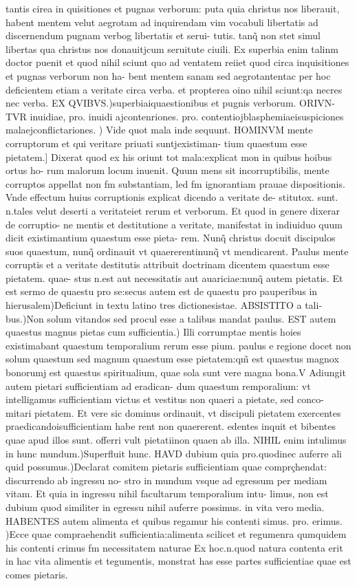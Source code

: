 \documentclass{article}
\begin{document}
\begin{pages}
\pstart tantis cirea in quisitiones et pugnas verborum: puta quia christus nos liberauit, habent mentem velut aegrotam ad inquirendam vim vocabuli libertatis ad discernendum pugnam verbog libertatis et serui- tutis. tanq̃ non stet simul libertas qua christus nos donauitjcum seruitute ciuili. Ex superbia enim talinm doctor puenit et quod nihil sciunt quo ad ventatem reiiet quod circa inquisitiones et pugnas verborum non ha- bent mentem sanam sed aegrotantentac per hoc deficientem etiam a veritate circa verba. et propterea oino nihil sciunt:qa necres nec verba. EX QVIBVS.)superbiaiquaestionibus et pugnis verborum. ORIVN- TVR inuidiae, pro. inuidi ajcontenriones. pro. contentiojblasphemiaeisuspiciones malaejconflictariones. ) Vide quot mala inde sequunt. HOMINVM mente corruptorum et qui veritare priuati suntjexistiman- tium quaestum esse pietatem.] Dixerat quod ex his oriunt tot mala:explicat mon in quibus hoibus ortus ho- rum malorum locum inuenit. Quum mens sit incorruptibilis, mente corruptos appellat non fm substantiam, led fm ignorantiam prauae dispositionis. Vnde effectum huius corruptionis explicat dicendo a veritate de- stitutox. sunt. n.tales velut deserti a veritateiet rerum et verborum. Et quod in genere dixerar de corruptio- ne mentis et destitutione a veritate, manifestat in indiuiduo quum dicit existimantium quaestum esse pieta- rem. Nunq̃ christus docuit discipulos suos quaestum, nunq̃ ordinauit vt quaererentinunq̃ vt mendicarent. Paulus mente corruptis et a veritate destitutis attribuit doctrinam dicentem quaestum esse pietatem. quae- stus n.est aut necessitatis aut auariciae:nunq̃ autem pietatis. Et est sermo de quaestu pro se:secus autem est de quaestu pro pauperibus in hierusalem)Deficiunt in textu latino tres dictionesistae. ABSISTITO a tali- bus.)Non solum vitandos sed procul esse a talibus mandat paulus. EST autem quaestus magnus pietas cum sufficientia.) Illi corrumptae mentis hoies existimabant quaestum temporalium rerum esse pium. paulus e regione docet non solum quaestum sed magnum quaestum esse pietatem:qm̃ est quaestus magnox bonorumj est quaestus spiritualium, quae sola sunt vere magna bona.V Adiungit autem pietari sufficientiam ad eradican- dum quaestum remporalium: vt intelligamus sufficientiam victus et vestitus non quaeri a pietate, sed conco- mitari pietatem. Et vere sic dominus ordinauit, vt discipuli pietatem exercentes praedicandoisufficientiam habe rent non quaererent. edentes inquit et bibentes quae apud illos sunt. offerri vult pietatiinon quaen ab illa. NIHIL enim intulimus in hunc mundum.)Superfluit hunc. HAVD dubium quia pro.quodinec auferre ali quid possumus.)Declarat comitem pietaris sufficientiam quae comprçhendat: discurrendo ab ingressu no- stro in mundum vsque ad egressum per mediam vitam. Et quia in ingressu nihil facultarum temporalium intu- limus, non est dubium quod similiter in egressu nihil auferre possimus. in vita vero media. HABENTES autem alimenta et quibus regamur his contenti simus. pro. erimus. )Ecce quae compraehendit sufficientia:alimenta scilicet et regumenra qumquidem his contenti crimus fm necessitatem naturae Ex hoc.n.quod natura contenta erit in hac vita alimentis et tegumentis, monstrat has esse partes sufficientiae quae est comes pietaris.  \pend

\end{pages}
\end{document}
